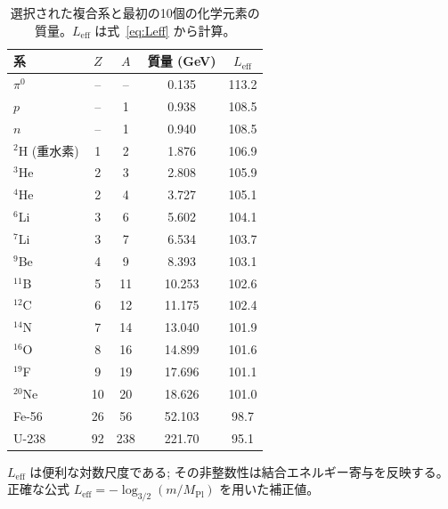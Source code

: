 \documentclass[11pt,a4paper]{article}
\theoremstyle{remark}
\begin{document}
	\begin{table}[H]
		\centering
		\caption{選択された複合系と最初の10個の化学元素の質量。\(L_{\mathrm{eff}}\) は式~\eqref{eq:Leff} から計算。}
		\label{tab:composite}
		\small
		\begin{tabular}{l c c c c}
			\toprule
			系 & \(Z\) & \(A\) & 質量 (GeV) & \(L_{\mathrm{eff}}\) \\
			\midrule
			\(\pi^0\) & – & – & 0.135 & 113.2 \\
			\(p\) & – & 1 & 0.938 & 108.5 \\
			\(n\) & – & 1 & 0.940 & 108.5 \\
			\(^2\)H (重水素) & 1 & 2 & 1.876 & 106.9 \\
			\(^3\)He & 2 & 3 & 2.808 & 105.9 \\
			\(^4\)He & 2 & 4 & 3.727 & 105.1 \\
			\(^6\)Li & 3 & 6 & 5.602 & 104.1 \\
			\(^7\)Li & 3 & 7 & 6.534 & 103.7 \\
			\(^9\)Be & 4 & 9 & 8.393 & 103.1 \\
			\(^{11}\)B & 5 & 11 & 10.253 & 102.6 \\
			\(^{12}\)C & 6 & 12 & 11.175 & 102.4 \\
			\(^{14}\)N & 7 & 14 & 13.040 & 101.9 \\
			\(^{16}\)O & 8 & 16 & 14.899 & 101.6 \\
			\(^{19}\)F & 9 & 19 & 17.696 & 101.1 \\
			\(^{20}\)Ne & 10 & 20 & 18.626 & 101.0 \\
			Fe-56 & 26 & 56 & 52.103 & 98.7 \\
			U-238 & 92 & 238 & 221.70 & 95.1 \\
			\bottomrule
		\end{tabular}
		\par\smallskip
		\footnotesize \(L_{\mathrm{eff}}\) は便利な対数尺度である; その非整数性は結合エネルギー寄与を反映する。正確な公式 \(L_{\mathrm{eff}} = -\log_{3/2}(m/M_{\mathrm{Pl}})\) を用いた補正値。
	\end{table}
	
\end{document}
